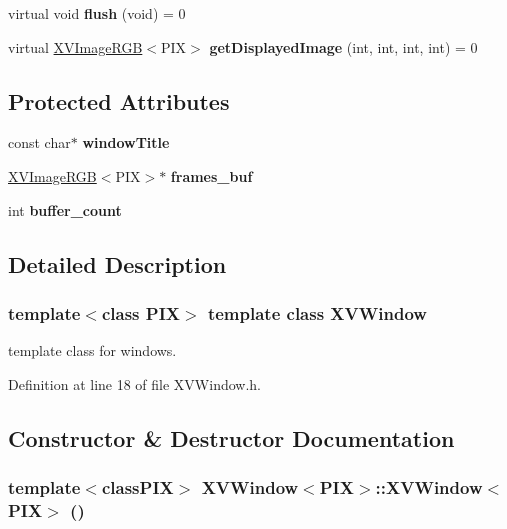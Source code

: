 \begin{CompactItemize}
\item 
\label{XVWindow_a10}
\hypertarget{class_XVWindow_a10}{
virtual void {\bf flush} (void) = 0}

\item 
\label{XVWindow_a11}
\hypertarget{class_XVWindow_a11}{
virtual \hyperlink{class_XVImageRGB}{XVImage\-RGB}$<$PIX$>$ {\bf get\-Displayed\-Image} (int, int, int, int) = 0}

\end{CompactItemize}
\subsection*{Protected Attributes}
\begin{CompactItemize}
\item 
const char$\ast$ {\bf window\-Title}
\item 
\hyperlink{class_XVImageRGB}{XVImage\-RGB}$<$PIX$>$$\ast$ {\bf frames\_\-buf}
\item 
int {\bf buffer\_\-count}
\end{CompactItemize}


\subsection{Detailed Description}
\subsubsection*{template$<$class PIX$>$  template class XVWindow}

template class for windows.





Definition at line 18 of file XVWindow.h.

\subsection{Constructor \& Destructor Documentation}
\label{XVWindow_a0}
\hypertarget{class_XVWindow_a0}{
\subsubsection[XVWindow]{\setlength{\rightskip}{0pt plus 5cm}template$<$classPIX$>$ XVWindow$<$PIX$>$::XVWindow$<$PIX$>$ ()}}




